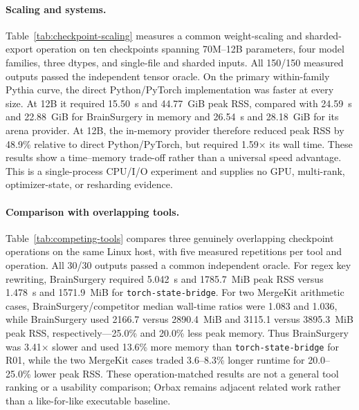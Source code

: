 \paragraph{Scaling and systems.}
Table~\ref{tab:checkpoint-scaling} measures a common weight-scaling and
sharded-export operation on ten
checkpoints spanning 70M--12B parameters, four model families, three dtypes,
and single-file and sharded inputs. All 150/150 measured outputs passed the
independent tensor oracle. On the primary within-family Pythia curve, the
direct Python/PyTorch implementation was faster at every size. At 12B it
required 15.50~s and 44.77~GiB peak RSS, compared with 24.59~s and 22.88~GiB
for BrainSurgery in memory and 26.54~s and 28.18~GiB for its arena provider.
At 12B, the in-memory provider therefore reduced peak RSS by 48.9\% relative
to direct Python/PyTorch, but required 1.59$\times$ its wall time. These results
show a time--memory trade-off rather than a universal speed
advantage. This is a single-process CPU/I/O experiment and supplies no GPU,
multi-rank, optimizer-state, or resharding evidence.

\paragraph{Comparison with overlapping tools.}
Table~\ref{tab:competing-tools} compares three genuinely overlapping checkpoint
operations on the same
Linux host, with five measured repetitions per tool and operation. All 30/30
outputs passed a common independent oracle. For regex key rewriting,
BrainSurgery required 5.042~s and 1785.7~MiB peak RSS versus 1.478~s and
1571.9~MiB for \texttt{torch-state-bridge}. For two MergeKit arithmetic cases,
BrainSurgery/competitor median wall-time ratios were 1.083 and 1.036, while
BrainSurgery used 2166.7 versus 2890.4~MiB and 3115.1 versus 3895.3~MiB peak
RSS, respectively---25.0\% and 20.0\% less peak memory. Thus BrainSurgery was
3.41$\times$ slower and used 13.6\% more memory than
\texttt{torch-state-bridge} for R01, while the two MergeKit cases traded
3.6--8.3\% longer runtime for 20.0--25.0\% lower peak RSS. These
operation-matched results are not a general tool
ranking or a usability comparison; Orbax remains adjacent related work rather
than a like-for-like executable baseline.
